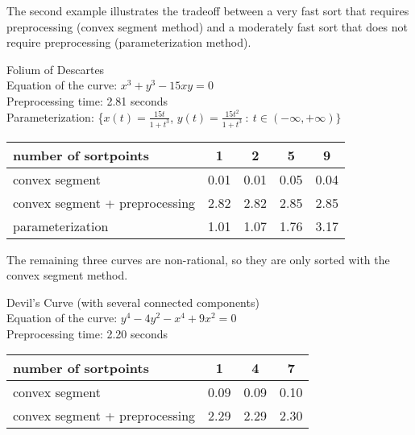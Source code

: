 The second example illustrates the tradeoff between a very fast sort 
that requires preprocessing (convex segment method) and a moderately fast 
sort that does not require preprocessing (parameterization method).
%
\begin{example}
\label{eg-folium}
Folium of Descartes\\
Equation of the curve: $x^{3} + y^{3} - 15xy = 0$\\
Preprocessing time: 2.81 seconds\\
Parameterization: \{$x(t) = \frac{15t}{1+t^{3}}$, \vspace{.5in}$y(t) = 
\frac{15t^{2}}{1+t^{3}}\ :\ t \in (-\infty, +\infty) \}$ \\
%
\begin{tabular}{|l|c|c|c|c|} \hline
number of sortpoints & 1 & 2 & 5 & 9 \\ \hline \hline
convex segment &           0.01 & 0.01 & 0.05 & 0.04 \\ \hline
convex segment + preprocessing & 2.82 & 2.82 & 2.85 & 2.85 \\ \hline
parameterization & 1.01 & 1.07 & 1.76 & 3.17 \\ \hline
\end{tabular}
%
\end{example}
%

\vspace{.2in}

The remaining three curves are non-rational, so they are only 
sorted with the convex segment method.

\clearpage

\begin{example}
\label{eg-devil}
Devil's Curve (with several connected components)\\
Equation of the curve: $y^{4} - 4y^{2} - x^{4} + 9x^{2} = 0$\\
Preprocessing time: 2.20 \vspace{.5in}seconds\\
%
\begin{tabular}{|l|c|c|c|} \hline
number of sortpoints & 1 & 4 & 7 \\ \hline \hline
convex segment & 0.09 & 0.09 & 0.10 \\ \hline
convex segment + preprocessing & 2.29 & 2.29 & 2.30 \\ \hline
\end{tabular}
\end{example}

